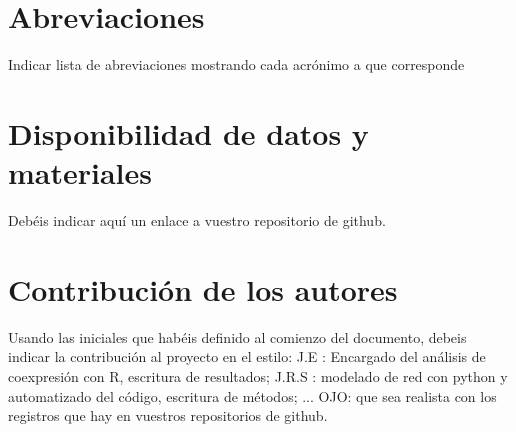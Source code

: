 \documentclass{bmcart}
\begin{document}
	
	
	
	
	
	
	
	
	
	
	\begin{backmatter}
	
		\section*{Abreviaciones}%
			Indicar lista de abreviaciones mostrando cada acrónimo a que corresponde
		
		\section*{Disponibilidad de datos y materiales}%
			Debéis indicar aquí un enlace a vuestro repositorio de github.
		
		\section*{Contribución de los autores}
			Usando las iniciales que habéis definido al comienzo del documento, debeis indicar la contribución al proyecto en el estilo:
			J.E : Encargado del análisis de coexpresión con R, escritura de resultados; J.R.S : modelado de red con python y automatizado del código, escritura de métodos; ...
			OJO: que sea realista con los registros que hay en vuestros repositorios de github. 
		
		
		
	
	\end{backmatter}
\end{document}
